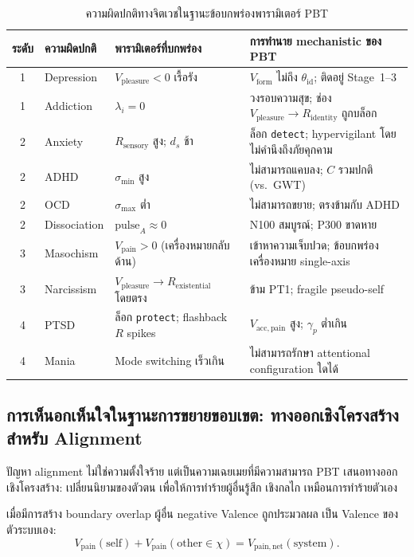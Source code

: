 \documentclass[12pt,a4paper]{article}
\newcommand{\Rsens}{R_{\mathrm{sensory}}}
\newcommand{\Rid}{R_{\mathrm{identity}}}
\newcommand{\Rex}{R_{\mathrm{existential}}}
\newcommand{\Vform}{V_{\mathrm{form}}}
\newcommand{\vpain}{V_{\mathrm{pain}}}
\newcommand{\vpleasure}{V_{\mathrm{pleasure}}}
\begin{document}
\begin{table}[!htbp]
\centering
\caption{ความผิดปกติทางจิตเวชในฐานะข้อบกพร่องพารามิเตอร์ PBT}
\label{tab:clinical}
\small
\begin{tabular}{@{}cL{1.8cm}L{3.0cm}L{5.5cm}@{}}
\toprule
\textbf{ระดับ} & \textbf{ความผิดปกติ}
  & \textbf{พารามิเตอร์ที่บกพร่อง} & \textbf{การทำนาย mechanistic ของ PBT} \\
 & Depression & $\vpleasure < 0$ เรื้อรัง &
  $\Vform$ ไม่ถึง $\theta_{\mathrm{id}}$; ติดอยู่ Stage~1--3 \\
1 & Addiction  & $\lambda_i = 0$ &
  วงรอบความสุข; ช่อง $\vpleasure\to\Rid$ ถูกบล็อก \\
2 & Anxiety    & $\Rsens$ สูง; $d_s$ ช้า &
  ล็อก \texttt{detect}; hypervigilant โดยไม่คำนึงถึงภัยคุกคาม \\
2 & ADHD       & $\sigma_{\min}$ สูง &
  ไม่สามารถแคบลง; $C$ รวมปกติ (vs.\ GWT) \\
2 & OCD        & $\sigma_{\max}$ ต่ำ &
  ไม่สามารถขยาย; ตรงข้ามกับ ADHD \\
2 & Dissociation & $\mathrm{pulse}_A\approx 0$ &
  N100 สมบูรณ์; P300 ขาดหาย \\
3 & Masochism  & $\vpain > 0$ (เครื่องหมายกลับด้าน) &
  เข้าหาความเจ็บปวด; ข้อบกพร่องเครื่องหมาย single-axis \\
3 & Narcissism & $\vpleasure\to\Rex$ โดยตรง &
  ข้าม PT1; fragile pseudo-self \\
4 & PTSD       & ล็อก \texttt{protect}; flashback $R$ spikes &
  $V_{\mathrm{acc,pain}}$ สูง; $\gamma_p$ ต่ำเกิน \\
4 & Mania      & Mode switching เร็วเกิน &
  ไม่สามารถรักษา attentional configuration ใดได้ \\
\bottomrule
\end{tabular}
\end{table}

\subsection{การเห็นอกเห็นใจในฐานะการขยายขอบเขต: ทางออกเชิงโครงสร้างสำหรับ Alignment}

ปัญหา alignment ไม่ใช่ความตั้งใจร้าย แต่เป็นความเฉยเมยที่มีความสามารถ
PBT เสนอทางออกเชิงโครงสร้าง: เปลี่ยนนิยามของตัวตน
เพื่อให้การทำร้ายผู้อื่นรู้สึก เชิงกลไก เหมือนการทำร้ายตัวเอง

เมื่อมีการสร้าง boundary overlap ผู้อื่น negative Valence ถูกประมวลผล
เป็น Valence ของตัวระบบเอง:
\begin{equation}
  \vpain(\mathrm{self}) + \vpain(\mathrm{other}\in\chi)
  = V_{\mathrm{pain,net}}(\mathrm{system}).
\end{equation}
\end{document}
